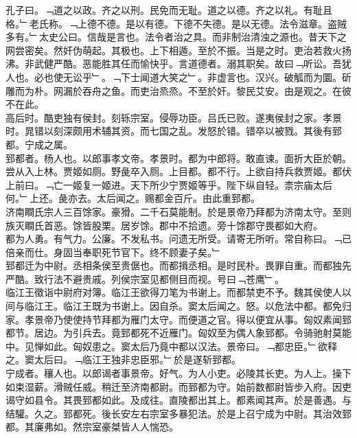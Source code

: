 \documentclass{zhvt-classic}
\begin{document}

\hspace*{2em}孔子曰。﹁道之以政。齐之以刑。民免而无耻。道之以德。齐之以礼。有耻且格。﹂老氏称。﹁上德不德。是以有德。下德不失德。是以无德。法令滋章。盗贼多有。﹂太史公曰。信哉是言也。法令者治之具。而非制治清浊之源也。昔天下之网尝密矣。然奸伪萌起。其极也。上下相遁。至於不振。当是之时。吏治若救火扬沸。非武健严酷。恶能胜其任而愉快乎。言道德者。溺其职矣。故曰﹁听讼。吾犹人也。必也使无讼乎﹂。﹁下士闻道大笑之﹂。非虚言也。汉兴。破觚而为圜。斫雕而为朴。网漏於吞舟之鱼。而吏治烝烝。不至於奸。黎民艾安。由是观之。在彼不在此。\\
\hspace*{2em}高后时。酷吏独有侯封。刻轹宗室。侵辱功臣。吕氏已败。遂夷侯封之家。孝景时。晁错以刻深颇用术辅其资。而七国之乱。发怒於错。错卒以被戮。其後有郅都。宁成之属。\\
\hspace*{2em}郅都者。杨人也。以郎事孝文帝。孝景时。都为中郎将。敢直谏。面折大臣於朝。尝从入上林。贾姬如厕。野彘卒入厕。上目都。都不行。上欲自持兵救贾姬。都伏上前曰。﹁亡一姬复一姬进。天下所少宁贾姬等乎。陛下纵自轻。柰宗庙太后何。﹂上还。彘亦去。太后闻之。赐都金百斤。由此重郅都。\\
\hspace*{2em}济南瞷氏宗人三百馀家。豪猾。二千石莫能制。於是景帝乃拜都为济南太守。至则族灭瞷氏首恶。馀皆股栗。居岁馀。郡中不拾遗。旁十馀郡守畏都如大府。\\
\hspace*{2em}都为人勇。有气力。公廉。不发私书。问遗无所受。请寄无所听。常自称曰。﹁已倍亲而仕。身固当奉职死节官下。终不顾妻子矣。﹂\\
\hspace*{2em}郅都迁为中尉。丞相条侯至贵倨也。而都揖丞相。是时民朴。畏罪自重。而都独先严酷。致行法不避贵戚。列侯宗室见都侧目而视。号曰﹁苍鹰﹂。\\
\hspace*{2em}临江王徵诣中尉府对簿。临江王欲得刀笔为书谢上。而都禁吏不予。魏其侯使人以间与临江王。临江王既为书谢上。因自杀。窦太后闻之。怒。以危法中都。都免归家。孝景帝乃使使持节拜都为雁门太守。而便道之官。得以便宜从事。匈奴素闻郅都节。居边。为引兵去。竟郅都死不近雁门。匈奴至为偶人象郅都。令骑驰射莫能中。见惮如此。匈奴患之。窦太后乃竟中都以汉法。景帝曰。﹁都忠臣。﹂欲释之。窦太后曰。﹁临江王独非忠臣邪。﹂於是遂斩郅都。\\
\hspace*{2em}宁成者。穰人也。以郎谒者事景帝。好气。为人小吏。必陵其长吏。为人上。操下如束湿薪。滑贼任威。稍迁至济南都尉。而郅都为守。始前数都尉皆步入府。因吏谒守如县令。其畏郅都如此。及成往。直陵都出其上。都素闻其声。於是善遇。与结驩。久之。郅都死。後长安左右宗室多暴犯法。於是上召宁成为中尉。其治效郅都。其廉弗如。然宗室豪桀皆人人惴恐。\\
\end{document}

